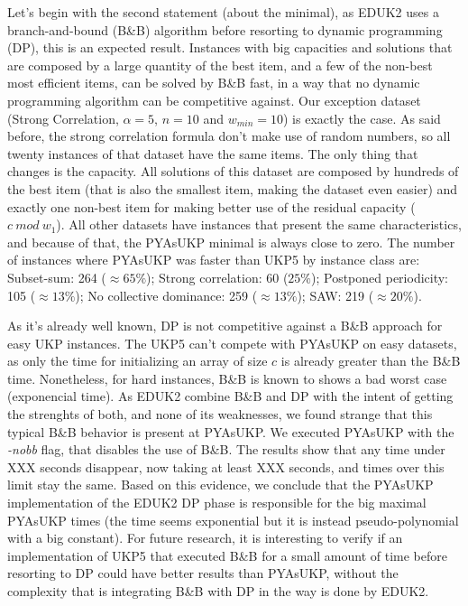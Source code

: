 \documentclass[runningheads,a4paper]{llncs}
\begin{document}
Let's begin with the second statement (about the minimal), as EDUK2 uses a branch-and-bound (B\&B) algorithm before resorting to dynamic programming (DP), this is an expected result. Instances with big capacities and solutions that are composed by a large quantity of the best item, and a few of the non-best most efficient items, can be solved by B\&B fast, in a way that no dynamic programming algorithm can be competitive against. Our exception dataset (Strong Correlation, \(\alpha = 5\), \(n = 10\) and \(w_{min} = 10\)) is exactly the case. As said before, the strong correlation formula don't make use of random numbers, so all twenty instances of that dataset have the same items. The only thing that changes is the capacity. All solutions of this dataset are composed by hundreds of the best item (that is also the smallest item, making the dataset even easier) and exactly one non-best item for making better use of the residual capacity (\(c~mod~w_1\)). All other datasets have instances that present the same characteristics, and because of that, the PYAsUKP minimal is always close to zero. The number of instances where PYAsUKP was faster than UKP5 by instance class are: Subset-sum: 264 (\(\approx65\%\)); Strong correlation: 60 (\(25\%\)); Postponed periodicity: 105 (\(\approx13\%\)); No collective dominance: 259 (\(\approx13\%\)); SAW: 219 (\(\approx20\%\)).


As it's already well known, DP is not competitive against a B\&B approach for easy UKP instances. The UKP5 can't compete with PYAsUKP on easy datasets, as only the time for initializing an array of size \(c\) is already greater than the B\&B time. Nonetheless, for hard instances, B\&B is known to shows a bad worst case (exponencial time). As EDUK2 combine B\&B and DP with the intent of getting the strenghts of both, and none of its weaknesses, we found strange that this typical B\&B behavior is present at PYAsUKP. We executed PYAsUKP with the \emph{-nobb} flag, that disables the use of B\&B. The results show that any time under XXX seconds disappear, now taking at least XXX seconds, and times over this limit stay the same. Based on this evidence, we conclude that the PYAsUKP implementation of the EDUK2 DP phase is responsible for the big maximal PYAsUKP times (the time seems exponential but it is instead pseudo-polynomial with a big constant). For future research, it is interesting to verify if an implementation of UKP5 that executed B\&B for a small amount of time before resorting to DP could have better results than PYAsUKP, without the complexity that is integrating B\&B with DP in the way is done by EDUK2.
\end{document}
